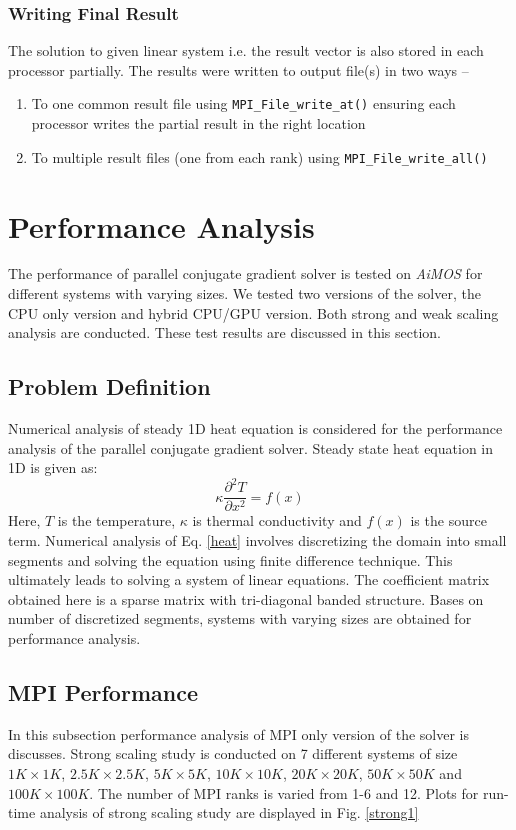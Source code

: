 \documentclass[sigplan,screen]{acmart}
\begin{document}
\subsubsection{Writing Final Result}
The solution to given linear system i.e. the result vector is also stored in each processor partially. The results were written to output file(s) in two ways -- 
\begin{enumerate}
	\item To one common result file using \texttt{MPI\_File\_write\_at()} ensuring each processor writes the partial result in the right location
	\item To multiple result files (one from each rank) using \texttt{MPI\_File\_write\_all()}
\end{enumerate}


\section{Performance Analysis}
The performance of parallel conjugate gradient solver is tested on \emph{AiMOS} for different systems with varying sizes. We tested two versions of the solver, the CPU only version and hybrid CPU/GPU version. Both strong and weak scaling analysis are conducted. These test results are discussed in this section. 
\subsection{Problem Definition}
Numerical analysis of steady 1D heat equation is considered for the performance analysis of the parallel conjugate gradient solver. Steady state heat equation in 1D is given as:
\begin{equation}\label{heat}
\kappa\frac{\partial^2 T}{\partial x^2}= f(x)
\end{equation}
Here, $T$ is the temperature, $\kappa$ is thermal conductivity and $f(x)$ is the source term. Numerical analysis of Eq. \eqref{heat} involves discretizing the domain into small segments and solving the equation using finite difference technique. This ultimately leads to solving a system of linear equations. The coefficient matrix obtained here is a sparse matrix with tri-diagonal banded structure. Bases on number of discretized segments, systems with varying sizes are obtained for performance analysis. 

\subsection{MPI Performance}\label{mpi_perfrom}
In this subsection performance analysis of MPI only version of the solver is discusses. Strong scaling study is conducted on 7 different systems of size $1K\times 1K$, $2.5K\times 2.5K$, $5K\times 5K$, $10K\times 10K$, $20K\times 20K$, $50K\times 50K$ and $100K\times 100K$. The number of MPI ranks is varied from 1-6 and 12. Plots for run-time analysis of strong scaling study are displayed in Fig. \ref{strong1}
\end{document}
